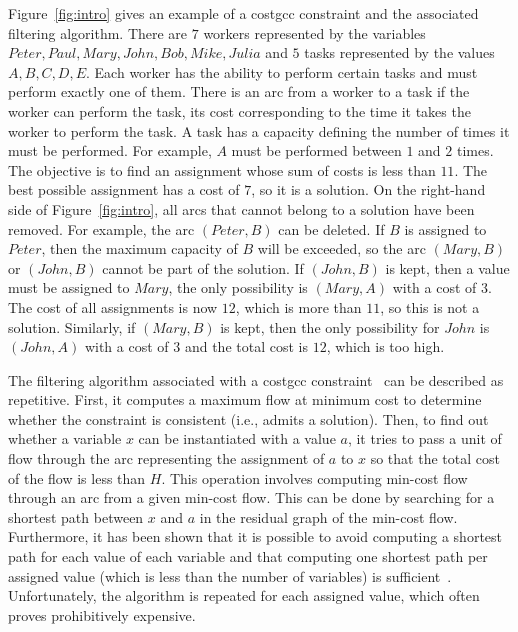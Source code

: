 Figure~\ref{fig:intro} gives an example of a costgcc constraint and the associated filtering algorithm.
There are $7$ workers represented by the variables ${Peter, Paul, Mary, John, Bob, Mike, Julia}$ and $5$ tasks represented by the values ${A, B, C, D, E}$. Each worker has the ability to perform certain tasks and must perform exactly one of them. There is an arc from a worker to a task if the worker can perform the task, its cost corresponding to the time it takes the worker to perform the task. A task has a capacity defining the number of times it must be performed. For example, $A$ must be performed between $1$ and $2$ times. The objective is to find an assignment whose sum of costs is less than $11$. The best possible assignment has a cost of $7$, so it is a solution. On the right-hand side of Figure~\ref{fig:intro}, all arcs that cannot belong to a solution have been removed. For example, the arc $(Peter, B)$ can be deleted. If $B$ is assigned to $Peter$, then the maximum capacity of $B$ will be exceeded, so the arc $(Mary, B)$ or $(John, B)$ cannot be part of the solution. If $(John, B)$ is kept, then a value must be assigned to $Mary$, the only possibility is $(Mary, A)$ with a cost of $3$. The cost of all assignments is now $12$, which is more than $11$, so this is not a solution. Similarly, if $(Mary, B)$ is kept, then the only possibility for $John$ is $(John, A)$ with a cost of $3$ and the total cost is $12$, which is too high.

The filtering algorithm associated with a costgcc constraint~\cite{Regin:CostbasedArcConsistencyforGlobalCardinalityConstraints} can be described as repetitive. First, it computes a maximum flow at minimum cost to determine whether the constraint is consistent (i.e., admits a solution). Then, to find out whether a variable $x$ can be instantiated with a value $a$, it tries to pass a unit of flow through the arc representing the assignment of $a$ to $x$ so that the total cost of the flow is less than $H$. 
This operation involves computing min-cost flow through an arc from a given min-cost flow. This can be done by searching for a shortest path between $x$ and $a$ in the residual graph of the min-cost flow. Furthermore, it has been shown that it is possible to avoid computing a shortest path for each value of each variable and that computing one shortest path per assigned value (which is less than the number of variables) is sufficient~\cite{Regin:CostbasedArcConsistencyforGlobalCardinalityConstraints}. Unfortunately, the algorithm is repeated for each assigned value, which often proves prohibitively expensive.

